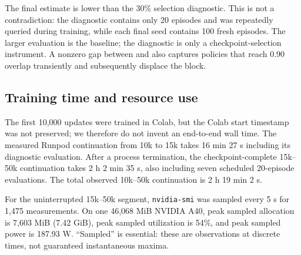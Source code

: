 The final estimate is lower than the 30\% selection diagnostic. This is not a contradiction: the
diagnostic contains only 20 episodes and was repeatedly queried during training, while each final
seed contains 100 fresh episodes. The larger evaluation is the baseline; the diagnostic is only a
checkpoint-selection instrument. A nonzero gap between \successonce and \successend also captures
policies that reach 0.90 overlap transiently and subsequently displace the block.

\subsection{Training time and resource use}

The first 10,000 updates were trained in Colab, but the Colab start timestamp was not preserved;
we therefore do not invent an end-to-end wall time. The measured Runpod continuation from 10k to
15k takes 16 min 27 s including its diagnostic evaluation. After a process termination, the
checkpoint-complete 15k--50k continuation takes 2 h 2 min 35 s, also including seven scheduled
20-episode evaluations. The total observed 10k--50k continuation is 2 h 19 min 2 s.

For the uninterrupted 15k--50k segment, \texttt{nvidia-smi} was sampled every 5 s for 1,475
measurements. On one 46,068 MiB NVIDIA A40, peak sampled allocation is 7,603 MiB (7.42 GiB), peak
sampled utilization is 54\%, and peak sampled power is 187.93 W. ``Sampled'' is essential: these
are observations at discrete times, not guaranteed instantaneous maxima.

